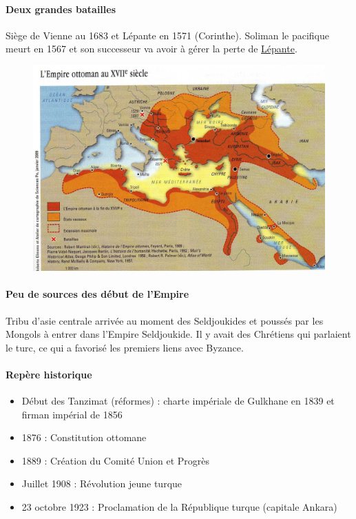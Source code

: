 \paragraph{Deux grandes batailles} Siège de Vienne au 1683 et Lépante en 1571 (Corinthe). Soliman le pacifique meurt en 1567 et son successeur va avoir à gérer la perte de \href{https://fr.wikipedia.org/wiki/Bataille_de_L%C3%A9pante}{Lépante}.
\begin{figure}[h!]
    \centering
    \includegraphics[width=\textwidth]{HistoireIslamMediterranee/Images/EmpireOttomanXVIIe.jpg}

    \label{fig:my_label}
\end{figure}
\paragraph{Peu de sources des début de l'Empire} Tribu d'asie centrale arrivée au moment des Seldjoukides et poussés par les Mongols à entrer dans l'Empire Seldjoukide.
Il y avait des Chrétiens qui parlaient le turc, ce qui a favorisé les premiers liens avec Byzance.



\paragraph{Repère historique}

\begin{itemize}
    \item  
Début des
Tanzimat (réformes) : charte impériale de Gulkhane en
1839 et firman impérial de 1856
    \item  
1876 : Constitution ottomane
    \item  
1889 : Création du Comité Union et Progrès
    \item  
Juillet 1908 : Révolution jeune
turque
    \item  
23 octobre
1923 : Proclamation de la République turque (capitale
Ankara)
\end{itemize}
